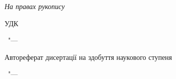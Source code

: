 \clearpage
\thispagestyle{empty}
\begin{center}
\MakeUppercase{\disserNationalAcademy}
\par
\MakeUppercase{\disserOrganization}
\end{center}

\begin{flushright}
  \textit{На правах рукопису}
\end{flushright}

\begin{center}
\textbf {\disserAuthor}
\end{center}

\vspace{0pt plus1fill}
\begin{flushright}
  УДК \disserUdk
\end{flushright}

\begin{center}
\vspace{0pt plus1fill}
\textbf {\disserTitle}

\vspace{0pt plus1fill}
{ \disserSpecialtyNumber\ "--- \disserSpecialtyTitle}

\vspace{0pt plus1.5fill}
Автореферат дисертації на здобуття наукового ступеня\par\disserDegree
\end{center}

\vspace{0pt plus1fill}


\vspace{0pt plus4fill}
\begin{center}
\disserCity\ "--- \disserYear
\end{center}
\clearpage

